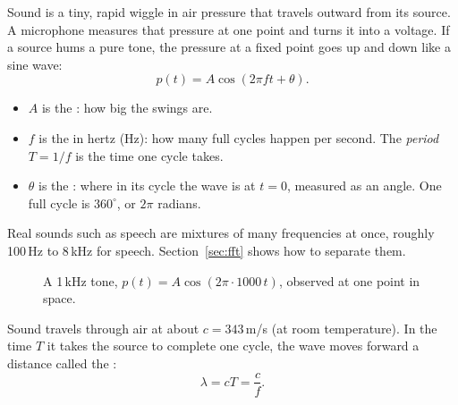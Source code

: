 \documentclass[11pt]{article}
\begin{document}
Sound is a tiny, rapid wiggle in air pressure that travels outward from its source. A microphone
measures that pressure at one point and turns it into a voltage. If a source hums a pure tone,
the pressure at a fixed point goes up and down like a sine wave:
\begin{equation}\label{eq:tone}
  p(t)=A\cos(2\pi f t+\theta).
\end{equation}
\begin{itemize}[nosep]
\item $A$ is the : how big the swings are.
\item $f$ is the  in hertz (Hz): how many full cycles happen per second.
  The \emph{period} $T=1/f$ is the time one cycle takes.
\item $\theta$ is the : where in its cycle the wave is at $t=0$, measured as an
  angle. One full cycle is $360^\circ$, or $2\pi$ radians.
\end{itemize}
Real sounds such as speech are mixtures of many frequencies at once, roughly 100\,Hz to 8\,kHz for
speech. Section~\ref{sec:fft} shows how to separate them.

\begin{figure}[ht]
\centering
{}
\caption{A 1\,kHz tone, $p(t)=A\cos(2\pi\cdot1000\,t)$, observed at one point in space.}
\label{fig:sine}
\end{figure}

Sound travels through air at about $c=343$\,m/s (at room temperature). In the time $T$ it takes
the source to complete one cycle, the wave moves forward a distance called the
:
\begin{equation}\label{eq:lambda}
  \lambda=cT=\frac{c}{f}.
\end{equation}
\end{document}
